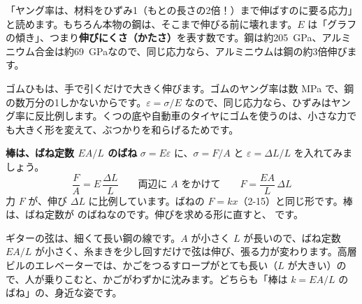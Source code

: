 \begin{phyomi}[$\sigma=E\varepsilon$]
「ヤング率は、材料をひずみ1（もとの長さの2倍！）まで伸ばすのに要る応力」と読めます。もちろん本物の鋼は、そこまで伸びる前に壊れます。$E$ は「グラフの傾き」、つまり\textbf{伸びにくさ（かたさ）}を表す数です。鋼は約\qty{205}{GPa}、アルミニウム合金は約\qty{69}{GPa}なので、同じ応力なら、アルミニウムは鋼の約3倍伸びます。
\end{phyomi}
\begin{phmijika}
ゴムひもは、手で引くだけで大きく伸びます。ゴムのヤング率は数 MPa で、鋼の数万分の1しかないからです。$\varepsilon=\sigma/E$ なので、同じ応力なら、ひずみはヤング率に反比例します。くつの底や自動車のタイヤにゴムを使うのは、小さな力でも大きく形を変えて、ぶつかりを和らげるためです。
\end{phmijika}

\begin{phmodel}[引っぱられる棒]
\end{phmodel}

\noindent\textbf{棒は、ばね定数 $EA/L$ のばね}\quad
$\sigma=E\varepsilon$ に、$\sigma=F/A$ と $\varepsilon=\Delta L/L$ を入れてみましょう。
\[\frac{F}{A}=E\,\frac{\Delta L}{L}\qquad\text{両辺に $A$ をかけて}\qquad F=\frac{EA}{L}\,\Delta L\]
力 $F$ が、伸び $\Delta L$ に比例しています。ばねの $F=kx$（2-15）と同じ形です。棒は、ばね定数が
のばねなのです。\label{ph:力-8:k}伸びを求める形に直すと、
です。
\begin{phmijika}
ギターの弦は、細くて長い鋼の線です。$A$ が小さく $L$ が長いので、ばね定数 $EA/L$ が小さく、糸まきを少し回すだけで弦は伸び、張る力が変わります。高層ビルのエレベーターでは、かごをつるすロープがとても長い（$L$ が大きい）ので、人が乗りこむと、かごがわずかに沈みます。どちらも「棒は $k=EA/L$ のばね」の、身近な姿です。
\end{phmijika}


